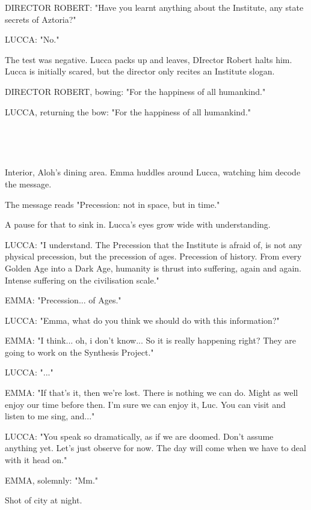\documentclass[11pt]{article}
\begin{document}
DIRECTOR ROBERT: "Have you learnt anything about the Institute, any state secrets of Aztoria?"

LUCCA: "No."

The test was negative.
Lucca packs up and leaves, DIrector Robert halts him.
Lucca is initially scared, but the director only recites an Institute slogan.

DIRECTOR ROBERT, bowing: "For the happiness of all humankind."

LUCCA, returning the bow: "For the happiness of all humankind."

\ 

\ 

Interior, Aloh's dining area. 
Emma huddles around Lucca, watching him decode the message.

The message reads "Precession: not in space, but in time."

A pause for that to sink in.
Lucca's eyes grow wide with understanding.

LUCCA: "I understand.
The Precession that the Institute is afraid of, is not any physical precession, but the precession of ages.
Precession of history.
From every Golden Age into a Dark Age, humanity is thrust into suffering, again and again.
Intense suffering on the civilisation scale."

EMMA: "Precession... of Ages."

LUCCA: "Emma, what do you think we should do with this information?"

EMMA: "I think... oh, i don't know...
So it is really happening right?
They are going to work on the Synthesis Project."

LUCCA: "..."

EMMA: "If that's it, then we're lost.
There is nothing we can do.
Might as well enjoy our time before then.
I'm sure we can enjoy it, Luc.
You can visit and listen to me sing, and..."

LUCCA: "You speak so dramatically, as if we are doomed.
Don't assume anything yet. 
Let's just observe for now.
The day will come when we have to deal with it head on."

EMMA, solemnly: "Mm."

Shot of city at night.
\end{document}
